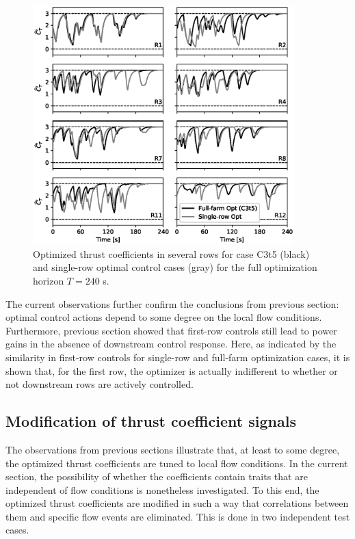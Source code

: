 	\begin{figure}
		\centering
		\includegraphics[width=0.9\textwidth]{chapters/analysis_induction_control/fullfarm_singlerow.eps}
		\caption[Optimized thrust coefficients in several rows for case C3t5 and single-row optimal control cases for the full optimization horizon $T = 240$ s.]{Optimized thrust coefficients in several rows for case C3t5 (black) and single-row optimal control cases (gray) for the full optimization horizon $T = 240$ s.\label{fig:control_C3t5_singlerow}}
	\end{figure}
	

	
	The current observations further confirm the conclusions from previous section: optimal control actions depend to some degree on the local flow conditions. Furthermore, previous section showed that first-row controls still lead to power gains in the absence of downstream control response. Here, as indicated by the similarity in first-row controls for single-row and full-farm optimization cases, it is shown that, for the first row, the optimizer is actually indifferent to whether or not downstream rows are actively controlled. 
	
	
	\subsection{Modification of thrust coefficient signals}\label{sec:modified_thrust}
	The observations from previous sections illustrate that, at least to some degree, the optimized thrust coefficients are tuned to local flow conditions. In the current section, the possibility of whether the coefficients contain traits that are independent of flow conditions is nonetheless investigated. To this end, the optimized thrust coefficients are modified in such a way that correlations between them and specific flow events are eliminated. This is done in two independent test cases.
	
